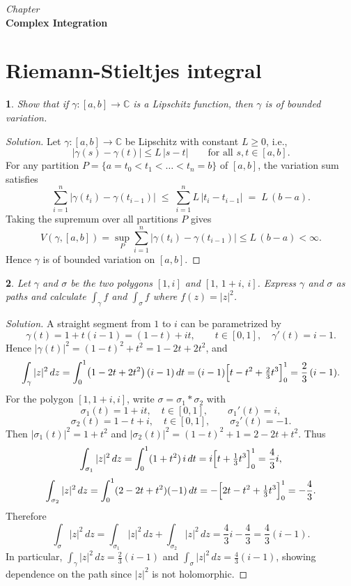 \documentclass[12pt, a4paper]{report}
\newcommand{\chapter}[1]{%
  \par\vspace{2em}%
  \refstepcounter{section}%
  \begin{center}
    \textit{Chapter \thesection} \\[1.5ex]
    \textbf{#1}
  \end{center}
  \vspace{1em}%
}
\theoremstyle{spaced}
\newtheorem{exercise}{}
\newcommand{\setexercise}[1]{\setcounter{exercise}{#1-1}}
\begin{document}
\chapter{Complex Integration}

\section{Riemann-Stieltjes integral}

\setexercise{6}
\begin{exercise}
	Show that if $\gamma : [a,b] \to \mathbb{C}$ is a Lipschitz function, then $\gamma$ is of bounded variation.
\end{exercise}

\begin{proof}[Solution]
	Let $\gamma:[a,b]\to\mathbb{C}$ be Lipschitz with constant $L\ge 0$, i.e.,
	\[
		|\gamma(s)-\gamma(t)|\le L\,|s-t| \qquad \text{for all } s,t\in[a,b].
	\]
	For any partition $P=\{a=t_0<t_1<\dots<t_n=b\}$ of $[a,b]$, the variation sum satisfies
	\[
		\sum_{i=1}^n \bigl|\gamma(t_i)-\gamma(t_{i-1})\bigr|
		\;\le\; \sum_{i=1}^n L\,|t_i-t_{i-1}|
		\;=\; L\,(b-a).
	\]
	Taking the supremum over all partitions $P$ gives
	\[
		V(\gamma,[a,b])
		=\sup_P \sum_{i=1}^n \bigl|\gamma(t_i)-\gamma(t_{i-1})\bigr|
		\le L\,(b-a)<\infty.
	\]
	Hence $\gamma$ is of bounded variation on $[a,b]$.
\end{proof}


\setexercise{8}
\begin{exercise}
	Let $\gamma$ and $\sigma$ be the two polygons $[1,i]$ and $[1,\,1+i,\,i]$. Express $\gamma$ and $\sigma$ as paths and calculate $\int_\gamma f$ and $\int_\sigma f$ where $f(z)=|z|^{2}$.
\end{exercise}

\begin{proof}[Solution]
	A straight segment from \(1\) to \(i\) can be parametrized by
	\[
		\gamma(t)=1+t(i-1)=(1-t)+it,\qquad t\in[0,1],\quad \gamma'(t)=i-1.
	\]
	Hence \(|\gamma(t)|^2=(1-t)^2+t^2=1-2t+2t^2\), and
	\[
		\int_\gamma |z|^2\,dz
		=\int_0^1 \bigl(1-2t+2t^2\bigr)\,(i-1)\,dt
		=(i-1)\Bigl[t-t^2+\tfrac{2}{3}t^3\Bigr]_0^1
		=\frac{2}{3}\,(i-1).
	\]
	For the polygon \( [1,1+i,i]\), write \(\sigma=\sigma_1*\sigma_2\) with
	\[
		\sigma_1(t)=1+it,\quad t\in[0,1],\qquad \sigma_1'(t)=i,
	\]
	\[
		\sigma_2(t)=1-t+i,\quad t\in[0,1],\qquad \sigma_2'(t)=-1.
	\]
	Then \(|\sigma_1(t)|^2=1+t^2\) and \(|\sigma_2(t)|^2=(1-t)^2+1=2-2t+t^2\). Thus
	\[
		\int_{\sigma_1} |z|^2\,dz=\int_0^1(1+t^2)\,i\,dt
		=i\Bigl[t+\tfrac{1}{3}t^3\Bigr]_0^1=\frac{4}{3}i,
	\]
	\[
		\int_{\sigma_2} |z|^2\,dz=\int_0^1(2-2t+t^2)(-1)\,dt
		=-\Bigl[2t-t^2+\tfrac{1}{3}t^3\Bigr]_0^1=-\frac{4}{3}.
	\]
	Therefore
	\[
		\int_\sigma |z|^2\,dz=\int_{\sigma_1}|z|^2\,dz+\int_{\sigma_2}|z|^2\,dz
		=\frac{4}{3}i-\frac{4}{3}=\frac{4}{3}(i-1).
	\]
	In particular, \(\displaystyle \int_\gamma |z|^2\,dz=\frac{2}{3}(i-1)\) and
	\(\displaystyle \int_\sigma |z|^2\,dz=\frac{4}{3}(i-1)\), showing dependence on the path since \( |z|^2 \) is not holomorphic.
\end{proof}
\end{document}
